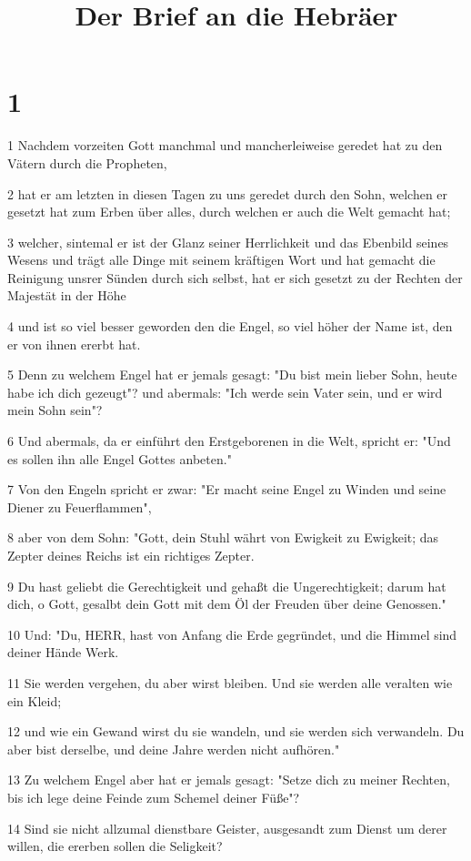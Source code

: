 

\title{Der Brief an die Hebräer}


\chapter{1}

\par 1 Nachdem vorzeiten Gott manchmal und mancherleiweise geredet hat zu den Vätern durch die Propheten,
\par 2 hat er am letzten in diesen Tagen zu uns geredet durch den Sohn, welchen er gesetzt hat zum Erben über alles, durch welchen er auch die Welt gemacht hat;
\par 3 welcher, sintemal er ist der Glanz seiner Herrlichkeit und das Ebenbild seines Wesens und trägt alle Dinge mit seinem kräftigen Wort und hat gemacht die Reinigung unsrer Sünden durch sich selbst, hat er sich gesetzt zu der Rechten der Majestät in der Höhe
\par 4 und ist so viel besser geworden den die Engel, so viel höher der Name ist, den er von ihnen ererbt hat.
\par 5 Denn zu welchem Engel hat er jemals gesagt: "Du bist mein lieber Sohn, heute habe ich dich gezeugt"? und abermals: "Ich werde sein Vater sein, und er wird mein Sohn sein"?
\par 6 Und abermals, da er einführt den Erstgeborenen in die Welt, spricht er: "Und es sollen ihn alle Engel Gottes anbeten."
\par 7 Von den Engeln spricht er zwar: "Er macht seine Engel zu Winden und seine Diener zu Feuerflammen",
\par 8 aber von dem Sohn: "Gott, dein Stuhl währt von Ewigkeit zu Ewigkeit; das Zepter deines Reichs ist ein richtiges Zepter.
\par 9 Du hast geliebt die Gerechtigkeit und gehaßt die Ungerechtigkeit; darum hat dich, o Gott, gesalbt dein Gott mit dem Öl der Freuden über deine Genossen."
\par 10 Und: "Du, HERR, hast von Anfang die Erde gegründet, und die Himmel sind deiner Hände Werk.
\par 11 Sie werden vergehen, du aber wirst bleiben. Und sie werden alle veralten wie ein Kleid;
\par 12 und wie ein Gewand wirst du sie wandeln, und sie werden sich verwandeln. Du aber bist derselbe, und deine Jahre werden nicht aufhören."
\par 13 Zu welchem Engel aber hat er jemals gesagt: "Setze dich zu meiner Rechten, bis ich lege deine Feinde zum Schemel deiner Füße"?
\par 14 Sind sie nicht allzumal dienstbare Geister, ausgesandt zum Dienst um derer willen, die ererben sollen die Seligkeit?

